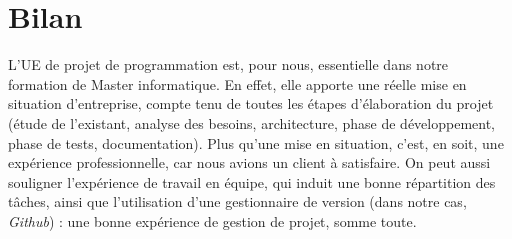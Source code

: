 \chapter{Bilan}


L'UE de projet de programmation est, pour nous, essentielle dans notre formation de Master informatique. En effet, elle apporte une réelle mise en situation d'entreprise, compte tenu de toutes les étapes d'élaboration du projet (étude de l'existant, analyse des besoins, architecture, phase de développement, phase de tests, documentation).
Plus qu'une mise en situation, c'est, en soit, une expérience professionnelle, car nous avions un client à satisfaire.
On peut aussi souligner l'expérience de travail en équipe, qui induit une bonne répartition des tâches, ainsi que l'utilisation d'une gestionnaire de version (dans notre cas, \textit{Github}) : une bonne expérience de gestion de projet, somme toute.
